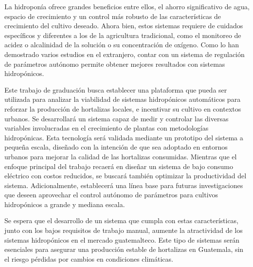 La hidroponía ofrece grandes beneficios entre ellos, el ahorro significativo de agua, espacio de crecimiento y un control más robusto de las características de crecimiento del cultivo deseado. Ahora bien, estos sistemas requiere de cuidados específicos y diferentes a los de la agricultura tradicional, como el monitoreo de acidez o alcalinidad de la solución o su concentración de oxígeno. Como lo han demostrado varios estudios en el extranjero, contar con un sistema de regulación de parámetros autónomo permite obtener mejores resultados con sistemas hidropónicos. 

Este trabajo de graduación busca establecer una plataforma que pueda ser utilizada para analizar la viabilidad de sistemas hidropónicos automáticos para reforzar la producción de hortalizas locales, e incentivar su cultivo en contextos urbanos. Se desarrollará un sistema capaz de medir y controlar las diversas variables involucradas en el crecimiento de plantas con metodologías hidropónicas. Esta tecnología será validada mediante un prototipo del sistema a pequeña escala, diseñado con la intención de que sea adoptado en entornos urbanos para mejorar la calidad de las hortalizas consumidas. Mientras que el enfoque principal del trabajo recaerá en diseñar un sistema de bajo consumo eléctrico con costos reducidos, se buscará también optimizar la productividad del sistema. Adicionalmente, establecerá una línea base para futuras investigaciones que deseen aprovechar el control autónomo de parámetros para cultivos hidropónicos a grande y mediana escala. 

Se espera que el desarrollo de un sistema que cumpla con estas características, junto con los bajos requisitos de trabajo manual, aumente la atractividad de los sistemas hidropónicos en el mercado guatemalteco. Este tipo de sistemas serán esenciales para asegurar una producción estable de hortalizas en Guatemala, sin el riesgo pérdidas por cambios en condiciones climáticas.
